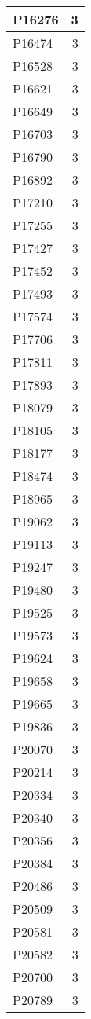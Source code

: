 \documentclass[
]{book}
\theoremstyle{definition}
\theoremstyle{definition}
\theoremstyle{definition}
\theoremstyle{definition}
\theoremstyle{remark}
\begin{document}
\begin{table}
\begin{tabular}{l|r}
\hline
P16276 & 3\\
\hline
P16474 & 3\\
\hline
P16528 & 3\\
\hline
P16621 & 3\\
\hline
P16649 & 3\\
\hline
P16703 & 3\\
\hline
P16790 & 3\\
\hline
P16892 & 3\\
\hline
P17210 & 3\\
\hline
P17255 & 3\\
\hline
P17427 & 3\\
\hline
P17452 & 3\\
\hline
P17493 & 3\\
\hline
P17574 & 3\\
\hline
P17706 & 3\\
\hline
P17811 & 3\\
\hline
P17893 & 3\\
\hline
P18079 & 3\\
\hline
P18105 & 3\\
\hline
P18177 & 3\\
\hline
P18474 & 3\\
\hline
P18965 & 3\\
\hline
P19062 & 3\\
\hline
P19113 & 3\\
\hline
P19247 & 3\\
\hline
P19480 & 3\\
\hline
P19525 & 3\\
\hline
P19573 & 3\\
\hline
P19624 & 3\\
\hline
P19658 & 3\\
\hline
P19665 & 3\\
\hline
P19836 & 3\\
\hline
P20070 & 3\\
\hline
P20214 & 3\\
\hline
P20334 & 3\\
\hline
P20340 & 3\\
\hline
P20356 & 3\\
\hline
P20384 & 3\\
\hline
P20486 & 3\\
\hline
P20509 & 3\\
\hline
P20581 & 3\\
\hline
P20582 & 3\\
\hline
P20700 & 3\\
\hline
P20789 & 3\\

\end{tabular}
\end{table}
\end{document}
